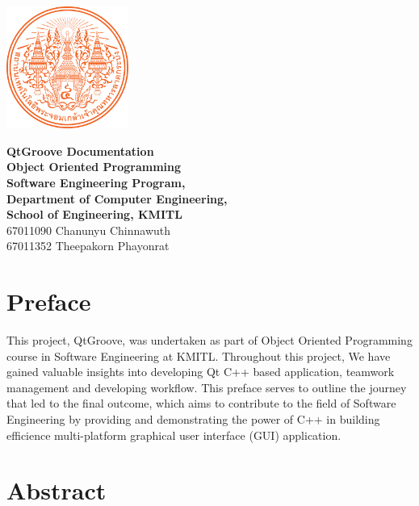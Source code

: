 \documentclass[12pt]{report} %
\begin{document}
\begin{titlepage}
	\centering
	\vspace*{1cm} %
	\includegraphics[width=0.3\textwidth]{images/KMITL Logo.png} %

	\vspace{1cm} %
	{\LARGE \textbf{QtGroove Documentation}} \\[0.5cm] %
	\vspace{0.5cm}
	{\large \textbf{Object Oriented Programming}} \\[0.5cm]
	{\large \textbf{Software Engineering Program,}} \\[0.5cm]
	{\large \textbf{Department of Computer Engineering,}} \\[0.5cm]
	{\large \textbf{School of Engineering, KMITL}} \\[1cm]
	{\Large 67011090 Chanunyu Chinnawuth \\ 67011352 Theepakorn Phayonrat} \\[0.5cm] %
\end{titlepage}

\chapter*{Preface}
\hspace{1cm}This project, QtGroove, was undertaken as part of Object Oriented Programming course in
Software Engineering at KMITL. Throughout this project, We have gained valuable insights into developing
Qt C++ based application, teamwork management and developing workflow. This preface serves to outline
the journey that led to the final outcome, which aims to contribute to the field of Software Engineering
by providing and demonstrating the power of C++ in building efficience multi-platform graphical user interface
(GUI) application.
\newpage

\chapter*{Abstract}
\end{document}
